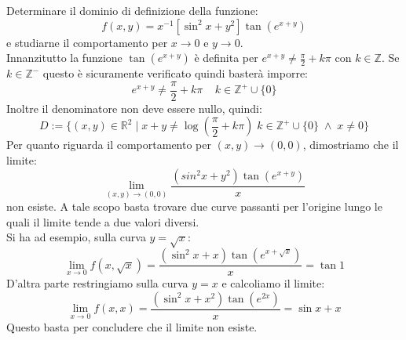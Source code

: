 \documentclass[a4paper]{article}
\numberwithin{equation}{subsection}
\begin{document}
{
    Determinare il dominio di definizione della funzione:
    \[f(x,y) = x^{-1}[\sin^2{x} + y^2]\tan{(e^{x+y})}\]
    e studiarne il comportamento per $x \rightarrow 0$ e $y \rightarrow 0$.\\
    Innanzitutto la funzione $\tan{(e^{x+y})}$ è definita per $e^{x+y} \neq \frac{\pi}{2} + k\pi$ con $k \in \mathbb{Z}$. Se $k \in \mathbb{Z}^-$ questo è sicuramente verificato quindi basterà imporre:
    \[e^{x+y} \neq \frac{\pi}{2} + k\pi \; \; \; \; k \in \mathbb{Z}^+ \cup \{0\}\] 
    Inoltre il denominatore non deve essere nullo, quindi:
    \[D := \{(x,y) \in \mathbb{R}^2\; | \; x + y \neq \log{\left(\frac{\pi}{2} + k\pi\right)} \; k \in \mathbb{Z}^+ \cup \{0\} \; \wedge \; x \neq 0\}\]
    Per quanto riguarda il comportamento per $(x,y) \rightarrow (0,0)$, dimostriamo che il limite:
    \[\lim_{(x,y) \rightarrow (0,0)} \frac{(sin^2{x} + y^2)\tan{(e^{x+y})}}{x}\]
    non esiste. A tale scopo basta trovare due curve passanti per l'origine lungo le quali il limite tende a due valori diversi.\\
    Si ha ad esempio, sulla curva $y = \sqrt{x}$:
    \[\lim_{x \rightarrow 0} f(x, \sqrt{x}) = \frac{(\sin^2{x} + x)\tan{(e^{x+\sqrt{x}})}}{x} = \tan{1} \]
    D'altra parte restringiamo sulla curva $y = x$ e calcoliamo il limite:
    \[\lim_{x \rightarrow 0} f(x,x) = \frac{(\sin^2{x} + x^2)\tan{(e^{2x})}}{x} = \sin{x} + x\]
    Questo basta per concludere che il limite non esiste.
}
\end{document}
